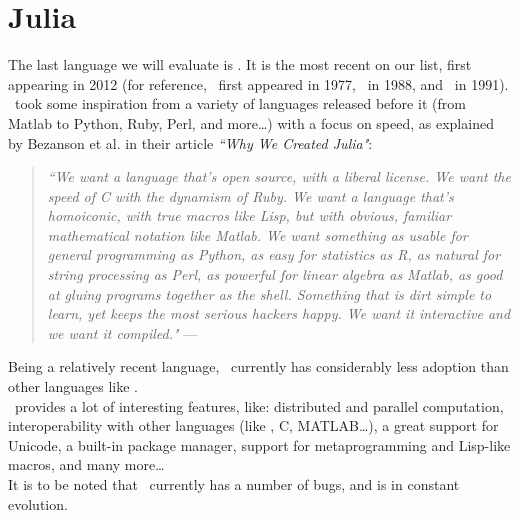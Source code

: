 
\renewcommand{\currentPart}{Julia} 

\newpage
\part{Julia} \label{Julia}

The last language we will evaluate is \julia. It is the most recent on our list, first appearing in 2012 (for reference, \awk\ first appeared in 1977, \perl\ in 1988, and \python\ in 1991). \\

\julia\ took some inspiration from a variety of languages released before it (from Matlab to Python, Ruby, Perl, and more\dots) with a focus on speed, as explained by Bezanson et al. in their article \emph{``Why We Created Julia"}:

\begin{quote}
	\emph{``We want a language that's open source, with a liberal license. We want the speed of C with the dynamism of Ruby. We want a language that's homoiconic, with true macros like Lisp, but with obvious, familiar mathematical notation like Matlab. We want something as usable for general programming as Python, as easy for statistics as R, as natural for string processing as Perl, as powerful for linear algebra as Matlab, as good at gluing programs together as the shell. Something that is dirt simple to learn, yet keeps the most serious hackers happy. We want it interactive and we want it compiled."} --- \cite{julia-manifesto}
\end{quote} 

\bigskip
\bigskip

Being a relatively recent language, \julia\ currently has considerably less adoption than other languages like \python.
\\

\julia\ provides a lot of interesting features, like: 
distributed and parallel computation,
interoperability with other languages (like \python, C, MATLAB\dots),
a great support for Unicode,
a built-in package manager,
support for metaprogramming and Lisp-like macros, and many more\dots\ 
\citep{features-of-julia} \citep{julia-features} \citep{julia-awesome-features}
\\

It is to be noted that \julia\ currently has a number of bugs, and is in constant evolution. 
\citep{is-julia-right-for-you} \\

\bigskip

